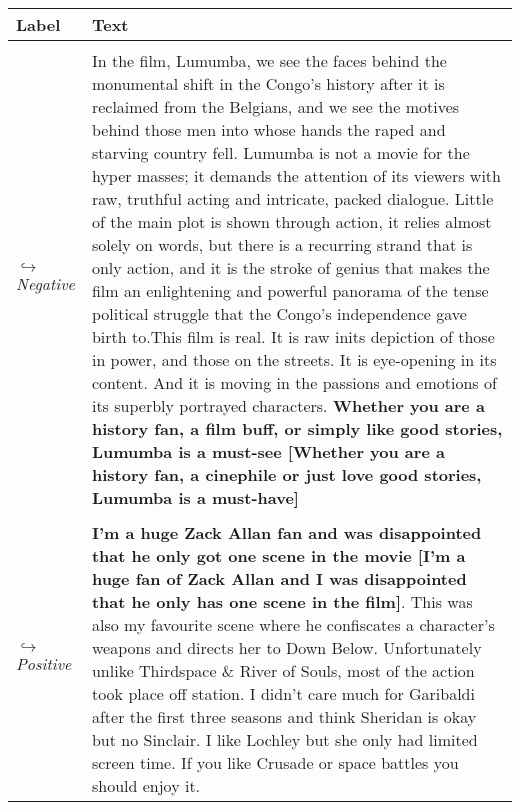 \documentclass[11pt,a4paper]{article}
\begin{document}
\begin{table*}[!ht]
  \centering
  \small
  \begin{tabular}{p{1.5cm}p{13.5cm}}
  \toprule
  {\bf Label}  & {\bf Text} \\
   \midrule
   \makecell[c]{{\it Positive}\\{{$\hookrightarrow$}\it Negative}} & \multicolumn{1}{m{13.5cm}}{In the film, Lumumba, we see the faces behind the monumental shift in the Congo's history after it is  reclaimed from the Belgians, and we see the motives behind those men into whose hands the raped and         starving country fell. Lumumba is not a movie for the hyper masses; it demands the  attention of its viewers with raw, truthful acting and intricate, packed dialogue. Little of the main   plot is shown through action, it relies almost solely on words, but there is a recurring strand that is only action, and it is the stroke of genius that makes the film an enlightening and powerful panorama  of the tense political struggle that the Congo's independence gave birth to.This film is   real. It is raw inits depiction of those in power, and those on the streets. It is eye-opening in its  content. And it is moving in the passions and emotions of its superbly portrayed characters. {\bf Whether you are a history fan, a film buff, or simply like good stories, Lumumba is a must-see {\color{red}[Whether you are a history fan, a cinephile or just love good stories, Lumumba is a must-have]}}}.\\
  \midrule
  \makecell[c]{{\it Negative}\\{{$\hookrightarrow$}\it Positive}} & \multicolumn{1}{m{13.5cm}}{{\bf I'm a huge Zack Allan fan and was disappointed that he only got one scene in the movie {\color{red}[I'm a huge fan of Zack Allan and I was disappointed that he only has one scene in the film]}}. This was also my favourite scene where he confiscates a character's weapons and directs her to Down Below. Unfortunately unlike Thirdspace \& River of Souls, most of the action took place off station. I didn't care much for Garibaldi after the first three seasons and think Sheridan is okay but no Sinclair. I like Lochley but she only had limited screen time. If you like Crusade or space battles you should enjoy it.}\\
  \bottomrule
  \end{tabular}
  \caption{Examples of generated adversarial text spans on the SST-5 dataset. The extracted and back-translated text spans are in {\bf bold}. The text in  parentheses {\color{red}[$\cdot$]} is the corresponding paraphrase to flip the prediction.}
  \label{tab:adversarial_example}
\end{table*}
\end{document}
